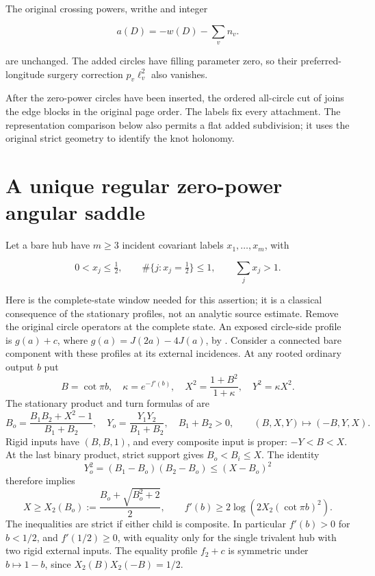 The original crossing powers, writhe and integer

\begin{equation}\label{plb:2}
a(D)=-w(D)-\sum_v n_v.
\end{equation}

are unchanged. The added circles have filling parameter zero, so their preferred-longitude surgery correction \(p_v\ell_v^2\) also vanishes.



After the zero-power circles have been inserted, the
ordered all-circle cut of \cite{Nonparabolic}
joins the edge blocks in the original page order. The labels fix every attachment.
The representation comparison below also permits a flat added
subdivision; it uses the original strict geometry to identify the knot
holonomy.

\section{A unique regular zero-power angular saddle}\label{plb:a-unique-regular-zero-power-angular-saddle}

Let a bare hub have \(m\ge3\) incident covariant labels \(x_1,\ldots,x_m\), with

\begin{equation}\label{plb:3}
0<x_j\le\tfrac12,\qquad
 \#\{j:x_j=\tfrac12\}\le1,\qquad
                         \sum_jx_j>1.
\end{equation}

Here is the complete-state window needed for this assertion; it is a
classical consequence of the stationary profiles, not an analytic source
estimate. Remove the original circle operators at the complete state.
An exposed circle-side profile is $g(a)+c$, where
$g(a)=J(2a)-4J(a)$, by \cite[Proposition 7.2]{Newton}.
Consider a connected bare component with these profiles at its external
incidences. At any rooted ordinary output $b$ put
\[
 B=\cot\pi b,\quad \kappa=e^{-f'(b)},\quad
 X^2=\frac{1+B^2}{1+\kappa},\quad Y^2=\kappa X^2.
\]
The stationary product and turn formulas of \cite[Lemma 7.1]{Newton}
are
\[
 B_o=\frac{B_1B_2+X^2-1}{B_1+B_2},\quad
 Y_o=\frac{Y_1Y_2}{B_1+B_2},\quad
 B_1+B_2>0,\qquad (B,X,Y)\longmapsto(-B,Y,X).
\]
Rigid inputs have $(B,B,1)$, and every composite input is proper:
$-Y<B<X$. At the last binary product, strict support gives
$B_o<B_i\le X$. The identity
\[
 Y_o^2=(B_1-B_o)(B_2-B_o)\le(X-B_o)^2
\]
therefore implies
\[
 X\ge X_2(B_o):=\frac{B_o+\sqrt{B_o^2+2}}2,
 \qquad f'(b)\ge 2\log(2X_2(\cot\pi b)^2).
\]
The inequalities are strict if either child is composite. In particular
$f'(b)>0$ for $b<1/2$, and $f'(1/2)\ge0$, with equality only for the
single trivalent hub with two rigid external inputs. The equality
profile $f_2+c$ is symmetric under $b\mapsto1-b$, since
$X_2(B)X_2(-B)=1/2$.

